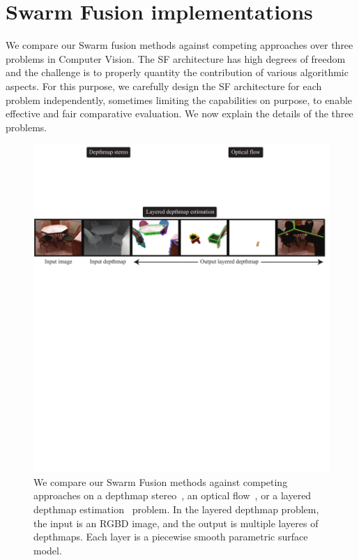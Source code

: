 \section{Swarm Fusion implementations}
We compare our Swarm fusion methods against competing approaches over
three problems in Computer Vision. The SF architecture has high degrees
of freedom and the challenge is to properly quantity the contribution of
various algorithmic aspects. For this purpose, we carefully design the
SF architecture for each problem independently, sometimes limiting the
capabilities on purpose, to enable effective and fair comparative
evaluation.  We now explain the details of the three problems.

%
\begin{figure}[tb]
 \includegraphics[width=\columnwidth]{figure/problem.pdf} \caption{We
 compare our Swarm Fusion methods against competing approaches on a
 depthmap stereo~\cite{middle_bury_stereo}, an optical
 flow~\cite{middlebury_optical_flow}, or a layered depthmap
 estimation~\cite{layered_depthmap} problem. In the layered depthmap
 problem, the input is an RGBD image, and the output is multiple layeres
 of depthmaps. Each layer is a piecewise smooth parametric surface
 model.}\label{fig:problem}
\end{figure}



